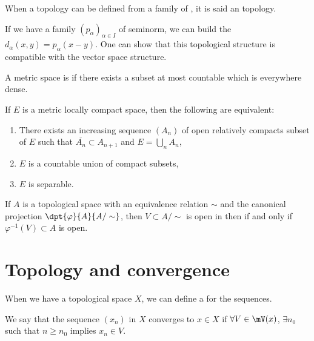 \begin{definition}
	When a topology can be defined from a family of \ecarts, it is said an  topology.
\end{definition}

If we have a family $(p_{\alpha})_{\alpha\in I}$ of seminorm, we can build the \ecarts\ $d_{\alpha}(x,y)=p_{\alpha}(x-y)$. One can show that this topological structure is compatible with the vector space structure.


\begin{definition}
	A metric space is  if there exists a subset at most countable which is everywhere dense.
\end{definition}

\begin{proposition}
	If $E$ is a metric locally compact space, then the following are equivalent:
	\begin{enumerate}
		\item There exists an increasing sequence $(A_n)$ of open relatively compacts subset of $E$ such that $\overline{A_n}\subset A_{n+1}$ and $E=\bigcup_n A_n$,

		\item $E$ is a countable union of compact subsets,

		\item $E$ is separable.
	\end{enumerate}
\end{proposition}

If $A$ is a topological space with an equivalence relation $\sim$ and the canonical projection $\dpt{\varphi}{A}{A/\sim}$, then $V\subset A/\sim$ is open in then  if and only if $\varphi^{-1}(V)\subset A$ is open.

\section{Topology and convergence}

When we have a topological space $X$, we can define a  for the sequences.

\begin{definition}
	We say that the sequence $(x_n)$ in $X$ converges to $x\in X$ if
	$\forall V\in\mV(x)$, $\exists n_0$ such that $n\geq n_0$ implies $x_n\in V$. \label{def:convergence}
\end{definition}

